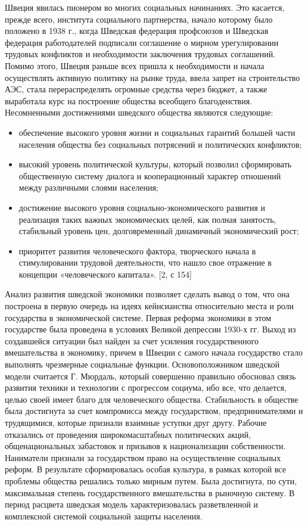 \documentclass[14pt,a4paper]{article}
\begin{document}
    Швеция явилась пионером во многих социальных начинаниях. Это касается, прежде всего, института социального партнерства, начало которому было положено в 1938 г., когда Шведская федерация профсоюзов и Шведская федерация работодателей подписали соглашение о мирном урегулировании трудовых конфликтов и необходимости заключения трудовых соглашений.
    Помимо этого, Швеция раньше всех пришла к необходимости и начала осуществлять активную политику на рынке труда, ввела запрет на строительство АЭС,
    стала перераспределять огромные средства через бюджет, а также выработала курс на построение общества всеобщего благоденствия.
    Несомненными достижениями шведского общества являются следующие:
    \begin{itemize}
        \item обеспечение высокого уровня жизни и социальных гарантий большей части населения общества без социальных потрясений и политических конфликтов;
        \item высокий уровень политической культуры, который позволил сформировать общественную систему диалога и кооперационный характер отношений между различными слоями населения;
        \item достижение высокого уровня социально-экономического развития и реализация таких важных экономических целей, как полная занятость, стабильный уровень цен, долговременный динамичный экономический рост;
        \item приоритет развития человеческого фактора, творческого начала в стимулировании трудовой деятельности, что нашло свое отражение в концепции «человеческого капитала». [2, с 154]
    \end{itemize}
    \par
    Анализ развития шведской экономики позволяет сделать вывод о том, что она построена в первую очередь на идеях кейнсианства относительно места и роли государства в экономической системе.
    Первая реформа экономики в этом государстве была проведена в условиях Великой депрессии 1930-х гг.
    Выход из создавшейся ситуации был найден за счет усиления государственного вмешательства в экономику, причем в Швеции с самого начала государство стало выполнять чрезмерные социальные функции.
    Основоположником шведской модели считается Г. Мюрдаль, который совершенно правильно обосновал связь развития техники и технологии с прогрессом социума, ибо все, что делается, целью своей имеет благо для человеческого общества.
    Стабильность в обществе была достигнута за счет компромисса между государством, предпринимателями и трудящимися, которые признали взаимные уступки друг другу. Рабочие отказались от проведения широкомасштабных политических акций, общенациональных забастовок и призывов к национализации собственности. Наниматели признали за государством право на осуществление социальных реформ. В результате сформировалась особая культура, в рамках которой все проблемы общества решались только мирным путем. Была достигнута, по сути, максимальная степень государственного вмешательства в рыночную систему. В период расцвета шведская модель характеризовалась разветвленной и комплексной системой социальной защиты населения.
\end{document}
